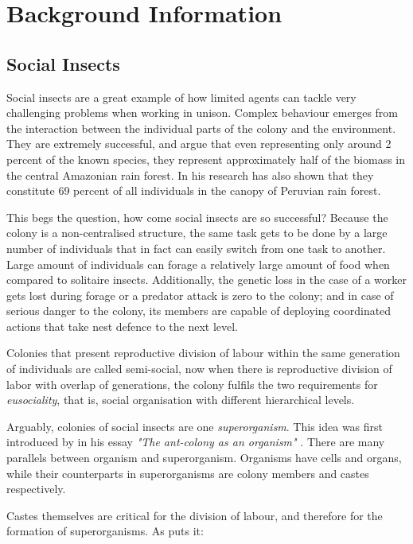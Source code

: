 \chapter{Background Information}
\label{ch:background-information}

\section {Social Insects}

Social insects are a great example of how limited agents can tackle very challenging problems when working in unison. Complex behaviour emerges from the interaction between the individual parts of the colony and the environment. They are extremely successful, and \citeauthor{Fittkau1973} argue that even representing only around 2 percent of the known species, they represent approximately  half of the biomass in the central Amazonian rain forest. In his research \citeauthor{erwin1989} has also shown that they constitute 69 percent of all individuals in the canopy of Peruvian rain forest.

This begs the question, how come social insects are so successful? Because the colony is a non-centralised structure, the same task gets to be done by a large number of individuals that in fact can easily switch from one task to another. Large amount of individuals can forage a relatively large amount of food when compared to solitaire insects. Additionally, the genetic loss in the case of a worker gets lost during forage or a predator attack is zero to the colony; and in case of serious danger to the colony, its members are capable of deploying coordinated actions that take nest defence to the next level.

Colonies that present reproductive division of labour within the same generation of individuals are called semi-social, now when there is reproductive division of labor with overlap of generations, the colony fulfils the two requirements for \emph{eusociality}, that is, social organisation with different hierarchical levels.   

Arguably, colonies of social insects are one \emph{superorganism}. This idea was first introduced by \citeauthor{JMOR:JMOR1050220206} in his essay \emph{"The ant-colony as an organism"} \cite{JMOR:JMOR1050220206}. There are many parallels between organism and superorganism. Organisms have cells and organs, while their counterparts in superorganisms are colony members and castes respectively. 

Castes themselves are critical for the division of labour, and therefore for the formation of superorganisms. As \citeauthor{citeulike:3731267} puts it:

